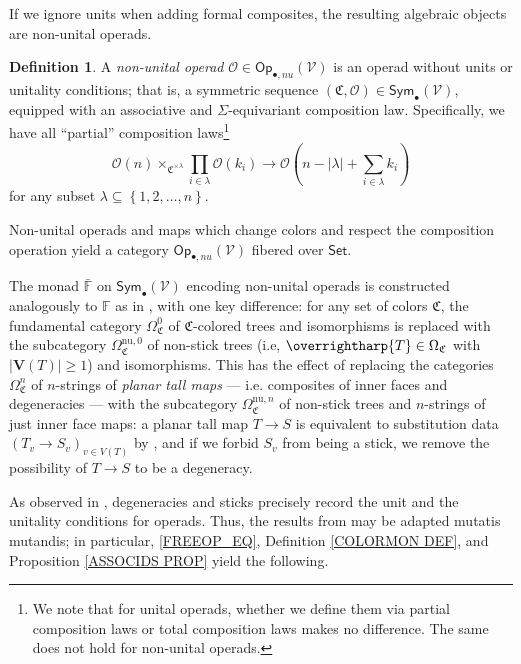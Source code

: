 \documentclass[a4paper,10pt
,draft
]{article}%
\numberwithin{equation}{section}
\numberwithin{figure}{section}
\theoremstyle{definition} %
\newtheorem{definition}[equation]{Definition}%
\newcommand{\set}[1]{\left\{#1\right\}}%
\newcommand{\longto}{\longrightarrow}%
\newcommand{\vect}[1]{\text{\overrightharp{\ensuremath{#1}}}}
\newcommand{\Sym}{\ensuremath{\mathsf{Sym}}}%
\newcommand{\Set}{\ensuremath{\mathsf{Set}}}
\newcommand{\Op}{\mathsf{Op}}%
\newcommand{\V}{\ensuremath{\mathcal V}}
\renewcommand{\O}{\ensuremath{\mathcal O}}
\newcommand{\1}{\ensuremath{\mathbbm 1}}%
\begin{document}
If we ignore units when adding formal composites, the resulting algebraic objects are non-unital operads.
\begin{definition}
      A \textit{non-unital operad} $\O \in \Op_{\bullet, nu}(\V)$ is an operad without units or unitality conditions; that is, 
      a symmetric sequence $(\mathfrak C, \O) \in \Sym_{\bullet}(\V)$,
      equipped with an associative and $\Sigma$-equivariant composition law.
      Specifically, we have all ``partial'' composition laws\footnote{
        We note that for unital operads, whether we define them via partial composition laws or total composition laws makes no difference. The same does not hold for non-unital operads.}
      \[
            \O(n) \times_{\mathfrak C^{\times \lambda}}
            \prod_{i \in \lambda} \O(k_i) \longto \O\left(n-|\lambda|+\sum_{i \in \lambda}k_i\right)
      \]
      for any subset $\lambda \subseteq \set{1,2,\dots,n}$.

      Non-unital operads and maps which change colors and respect the composition operation yield
      a category $\Op_{\bullet,nu}(\V)$ fibered over $\Set$.      
\end{definition}

The monad $\bar{\mathbb F}$ on $\Sym_\bullet(\V)$ encoding non-unital operads
is constructed analogously to $\mathbb F$ as in \cite[Appendix A]{BP_HGOP}, %
with one key difference:
for any set of colors $\mathfrak C$,
the fundamental category $\Omega_{\mathfrak C}^0$ of $\mathfrak C$-colored trees and isomorphisms
is replaced with the subcategory $\Omega_{\mathfrak C}^{\textrm{nu},0}$ of non-stick trees (i.e, $\vect T \in \Omega_{\mathfrak C}$ with $|\boldsymbol{V}(T)| \geq 1$) and isomorphisms.
This has the effect of replacing the categories $\Omega_{\mathfrak C}^n$ of $n$-strings of \textit{planar tall maps} --- i.e. composites of inner faces and degeneracies --- 
with the subcategory $\Omega_{\mathfrak C}^{\textrm{nu},n}$ of
non-stick trees and $n$-strings of just inner face maps:
a planar tall map $T \to S$ is equivalent to substitution data $(T_v \to S_v)_{v \in V(T)}$ by \cite[Prop. 3.41]{BP_geo},
and if we forbid $S_v$ from being a stick,
we remove the possibility of $T \to S$ to be a degeneracy.

As observed in \cite{BP_geo} , degeneracies and sticks precisely record the unit and the unitality conditions for operads.
Thus, the results from \cite[Appendix A]{BP_HGOP} %
may be adapted mutatis mutandis;
in particular, \eqref{FREEOP_EQ}, Definition \ref{COLORMON DEF}, and Proposition \ref{ASSOCIDS PROP} yield the following.
\end{document}
